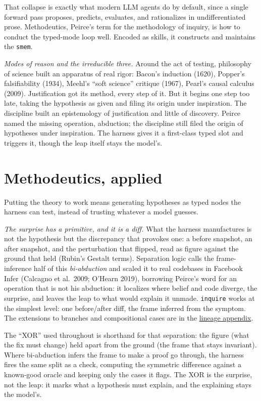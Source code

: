 \documentclass[
  10pt,
]{article}
\begin{document}
That collapse is exactly what modern LLM agents do by default, since a
single forward pass proposes, predicts, evaluates, and rationalizes in
undifferentiated prose. Methodeutics, Peirce's term for the methodology
of inquiry, is how to conduct the typed-mode loop well. Encoded as
skills, it constructs and maintains the \texttt{smem}.

\emph{Modes of reason and the irreducible three.} Around the act of
testing, philosophy of science built an apparatus of real rigor: Bacon's
induction (1620), Popper's falsifiability (1934), Meehl's ``soft
science'' critique (1967), Pearl's causal calculus (2009). Justification
got its method, every step of it. But it begins one step too late,
taking the hypothesis as given and filing its origin under inspiration.
The discipline built an epistemology of justification and little of
discovery. Peirce named the missing operation, abduction; the discipline
still filed the origin of hypotheses under inspiration. The harness
gives it a first-class typed slot and triggers it, though the leap
itself stays the model's.

\section{Methodeutics, applied}\label{application}

Putting the theory to work means generating hypotheses as typed nodes
the harness can test, instead of trusting whatever a model guesses.

\emph{The surprise has a primitive, and it is a diff.} What the harness
manufactures is not the hypothesis but the discrepancy that provokes
one: a before snapshot, an after snapshot, and the perturbation that
flipped, read as figure against the ground that held (Rubin's Gestalt
terms). Separation logic calls the frame-inference half of this
\emph{bi-abduction} and scaled it to real codebases in Facebook Infer
(Calcagno et al.~2009; O'Hearn 2019), borrowing Peirce's word for an
operation that is not his abduction: it localizes where belief and code
diverge, the surprise, and leaves the leap to what would explain it
unmade. \texttt{inquire} works at the simplest level: one before/after
diff, the frame inferred from the symptom. The extensions to branches
and compositional cases are in the \hyperref[lineage]{lineage appendix}.

The ``XOR'' used throughout is shorthand for that separation: the figure
(what the fix must change) held apart from the ground (the frame that
stays invariant). Where bi-abduction infers the frame to make a proof go
through, the harness fires the same split as a check, computing the
symmetric difference against a known-good oracle and keeping only the
cases it flags. The XOR is the surprise, not the leap: it marks what a
hypothesis must explain, and the explaining stays the model's.
\end{document}
